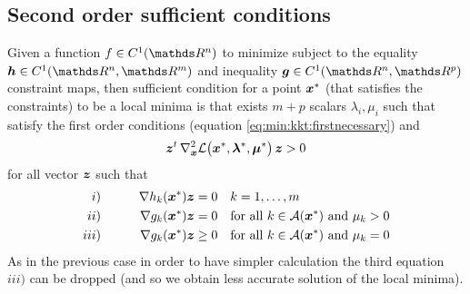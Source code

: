 \subsection{Second order sufficient conditions} 
	Given a function $f \in C^1(\R^n)$ to minimize subject to the equality $\vett h\in C^1(\R^n,\R^m)$ and inequality $\vett g \in C^1(\R^n,\R^p)$ constraint maps, then sufficient condition for a point $\boldsymbol{x}^*$ (that satisfies the constraints) to be a local minima is that exists $m+p$ scalars $\lambda_i,\mu_i$ such that satisfy the first order conditions (equation \ref{eq:min:kkt:firstnecessary}) and 
	\begin{equation}
		\boldsymbol{z}^t \, \nabla^2_{\boldsymbol{x}} \mathcal L\big(\boldsymbol{x}^*,\boldsymbol{\lambda}^*,\boldsymbol{\mu}^*\big) \, \boldsymbol{z} > 0
	\end{equation}	
	for all vector $\boldsymbol{z}$ such that
	\begin{align*}
		i) \qquad && \nabla h_k(\boldsymbol{x}^*) \boldsymbol{z} & = 0 && k = 1,\dots,m \\
		ii) \qquad &&\nabla g_k(\boldsymbol{x}^*) \boldsymbol{z} & = 0 && \textrm{for all } k\in \mathcal A(\boldsymbol{x}^*) \textrm{ and } \mu_k > 0 \\
		iii) \qquad &&\nabla g_k(\boldsymbol{x}^*) \boldsymbol{z} & \geq 0 && \textrm{for all } k\in \mathcal A(\boldsymbol{x}^*) \textrm{ and } \mu_k = 0
	\end{align*}
	As in the previous case in order to have simpler calculation the third equation $iii)$ can be dropped (and so we obtain less accurate solution of the local minima).
	
